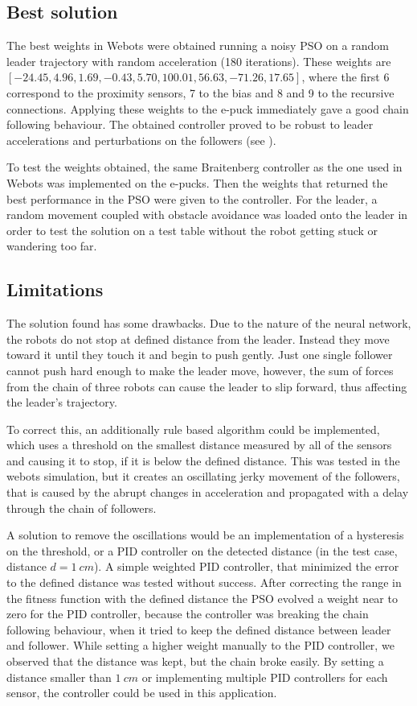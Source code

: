 \documentclass[a4paper, 10pt, conference]{ieeeconf}      %
\begin{document}
\subsection{Best solution} The best weights in Webots were obtained running a noisy PSO on a random leader trajectory with random acceleration (180 iterations). These weights are $[-24.45, 4.96, 1.69, -0.43, 5.70, 100.01, 56.63, -71.26, 17.65]$, where the first 6 correspond to the proximity sensors, 7 to the bias and 8 and 9 to the recursive connections. Applying these weights to the e-puck immediately gave a good chain following behaviour. The obtained controller proved to be robust to leader accelerations and perturbations on the followers (see \cite{c5}).

To test the weights obtained, the same Braitenberg controller as the one used in Webots was implemented on the e-pucks. Then the weights that returned the best performance in the PSO were given to the controller. For the leader, a random movement coupled with obstacle avoidance was loaded onto the leader in order to test the solution on a test table without the robot getting stuck or wandering too far.

\subsection{Limitations}
The solution found has some drawbacks. Due to the nature of the neural network, the robots do not stop at defined distance from the leader. Instead they move toward it until they touch it and begin to push gently. Just one single follower cannot push hard enough to make the leader move, however, the sum of forces from the chain of three robots can cause the leader to slip forward, thus affecting the leader's trajectory.

To correct this, an additionally rule based algorithm could be implemented, which uses a threshold on the smallest distance measured by all of the sensors and causing it to stop, if it is below the defined distance. This was tested in the webots simulation, but it creates an oscillating jerky movement of the followers, that is caused by the abrupt changes in acceleration and propagated with a delay through the chain of followers. 

A solution to remove the oscillations would be an implementation of a hysteresis on the threshold, or a PID controller on the detected distance (in the test case, distance $d=1 \:cm$). A simple weighted PID controller, that minimized the error to the defined distance was tested without success. After correcting the range in the fitness function with the defined distance the PSO evolved a weight near to zero for the PID controller, because the controller was breaking the chain following behaviour, when it tried to keep the defined distance between leader and follower. While setting a higher weight manually to the PID controller, we observed that the distance was kept, but the chain broke easily. By setting a distance smaller than $1 \:cm$ or implementing multiple PID controllers for each sensor, the controller could be used in this application.
\end{document}
